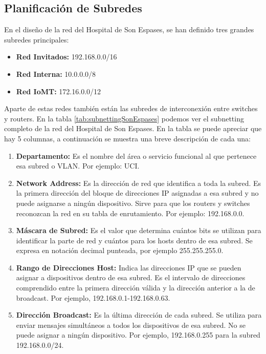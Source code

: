 \subsection{Planificación de Subredes}
En el diseño de la red del Hospital de Son Espases, se han definido tres grandes subredes principales:
\begin{itemize}
    \item \textbf{Red Invitados:} 192.168.0.0/16
    \item \textbf{Red Interna:} 10.0.0.0/8
    \item \textbf{Red IoMT:} 172.16.0.0/12
\end{itemize}
Aparte de estas redes también están las subredes de interconexión entre switches y routers. En la tabla \ref{tab:subnettingSonEspases} podemos ver el subnetting completo de la red del Hospital de 
Son Espases. En la tabla se puede apreciar que hay 5 columnas, a continuación se muestra una breve descripción de cada una:
\begin{enumerate}
    \item \textbf{Departamento:} Es el nombre del área o servicio funcional al que pertenece esa subred o VLAN. Por ejemplo: UCI.
    \item \textbf{Network Address:} Es la dirección de red que identifica a toda la subred. Es la primera dirección del bloque de direcciones IP asignadas a esa subred 
    y no puede asignarse a ningún dispositivo. Sirve para que los routers y switches reconozcan la red en su tabla de enrutamiento. Por ejemplo: 192.168.0.0.
    \item \textbf{Máscara de Subred:} Es el valor que determina cuántos bits se utilizan para identificar la parte de red y cuántos para los hosts dentro de esa subred. 
    Se expresa en notación decimal punteada, por ejemplo 255.255.255.0.
    \item \textbf{Rango de Direcciones Host:} Indica las direcciones IP que se pueden asignar a dispositivos dentro de esa subred. Es el intervalo de direcciones 
    comprendido entre la primera dirección válida y la dirección anterior a la de broadcast. Por ejemplo, 192.168.0.1-192.168.0.63.
    \item \textbf{Dirección Broadcast:} Es la última dirección de cada subred. Se utiliza para enviar mensajes simultáneos a todos los dispositivos de esa subred. No se 
    puede asignar a ningún dispositivo. Por ejemplo, 192.168.0.255 para la subred 192.168.0.0/24.
\end{enumerate}

